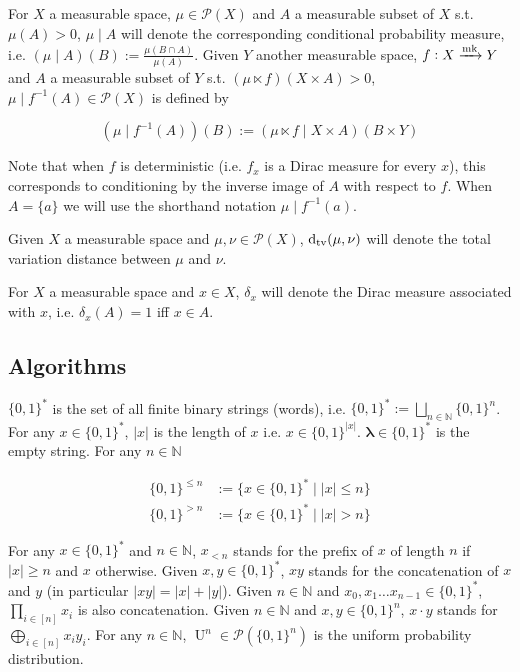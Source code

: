 \documentclass{article}
\numberwithin{equation}{section}
\theoremstyle{definition}
\theoremstyle{plain}
\newcommand{\Bool}{\{0,1\}}
\newcommand{\Words}{{\Bool^*}}
\newcommand{\WordsLen}[1]{{\Bool^{#1}}}
\DeclareMathOperator{\Un}{U}
\newcommand{\Dtv}{\operatorname{d}_{\textnormal{tv}}}
\newcommand{\Nats}{\mathbb{N}}
\newcommand{\Estr}{\bm{\lambda}}
\newcommand{\Abs}[1]{\lvert #1 \rvert}
\newcommand{\Markov}{\xrightarrow{\textnormal{mk}}}
\begin{document}
For $X$ a measurable space, $\mu \in \mathcal{P}(X)$ and $A$ a measurable subset of $X$ s.t. ${\mu(A) > 0}$, $\mu \mid A$ will denote the corresponding conditional probability measure, i.e. $(\mu \mid A)(B):=\frac{\mu(B \cap A)}{\mu(A)}$. Given $Y$ another measurable space, $f: X \Markov Y$ and $A$ a measurable subset of $Y$ s.t. $(\mu \ltimes f)(X \times A) > 0$,\\ $\mu \mid f^{-1}(A) \in \mathcal{P}(X)$ is defined by 

\[(\mu \mid f^{-1}(A))(B):=(\mu \ltimes f \mid X \times A)(B \times Y)\]

Note that when $f$ is deterministic (i.e. $f_x$ is a Dirac measure for every $x$), this corresponds to conditioning by the inverse image of $A$ with respect to $f$. When $A=\{a\}$ we will use the shorthand notation $\mu \mid f^{-1}(a)$.

Given $X$ a measurable space and $\mu,\nu \in \mathcal{P}(X)$, $\Dtv(\mu,\nu)$ will denote the total variation distance between $\mu$ and $\nu$.

For $X$ a measurable space and $x \in X$, $\delta_x$ will denote the Dirac measure associated with $x$, i.e. $\delta_x(A)=1$ iff $x \in A$.

\subsection{Algorithms}

$\Words$ is the set of all finite binary strings (words), i.e. $\Words:=\bigsqcup_{n \in \Nats} \Bool^n$. For any ${x \in \Words}$, $\Abs{x}$ is the length of $x$ i.e. $x \in \WordsLen{\Abs{x}}$. ${\Estr \in \Words}$ is the empty string. For any $n \in \Nats$

\begin{align*}
\Bool^{\leq n}&:=\{x \in \Words \mid \Abs{x} \leq n\} \\
\Bool^{>n}&:=\{x \in \Words \mid \Abs{x} > n\}
\end{align*}

For any $x \in \Words$ and $n \in \Nats$, $x_{< n}$ stands for the prefix of $x$ of length $n$ if $\Abs{x} \geq n$ and $x$ otherwise. Given $x,y \in \Words$, $xy$ stands for the concatenation of $x$ and $y$ (in particular $\Abs{xy}=\Abs{x}+\Abs{y}$). Given ${n \in \Nats}$ and ${x_0, x_1 \ldots x_{n-1} \in \Words}$, ${\prod_{i \in [n]} x_i}$ is also concatenation. Given $n \in \Nats$ and $x,y \in \WordsLen{n}$, $x \cdot y$ stands for $\bigoplus_{i \in [n]} x_i y_i$. For any $n \in \Nats$, $\Un^n \in \mathcal{P}(\WordsLen{n})$ is the uniform probability distribution.
\end{document}

